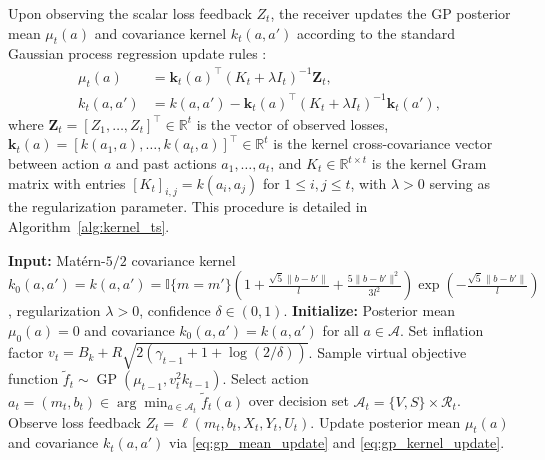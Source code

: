 Upon observing the scalar loss feedback $Z_t$, the receiver updates the GP posterior mean $\mu_t(a)$ and covariance kernel $k_t(a, a')$ according to the standard Gaussian process regression update rules \citep{chowdhury2017kernelized}:
\begin{align}
    \mu_t(a) &= \mathbf{k}_t(a)^\top (K_t + \lambda I_t)^{-1} \mathbf{Z}_t, \label{eq:gp_mean_update} \\
    k_t(a, a') &= k(a, a') - \mathbf{k}_t(a)^\top (K_t + \lambda I_t)^{-1} \mathbf{k}_t(a'), \label{eq:gp_kernel_update}
\end{align}
where $\mathbf{Z}_t = [Z_1, \ldots, Z_t]^\top \in \mathbb{R}^t$ is the vector of observed losses, $\mathbf{k}_t(a) = [k(a_1, a), \ldots, k(a_t, a)]^\top \in \mathbb{R}^t$ is the kernel cross-covariance vector between action $a$ and past actions $a_1, \ldots, a_t$, and $K_t \in \mathbb{R}^{t \times t}$ is the kernel Gram matrix with entries $[K_t]_{i,j} = k(a_i, a_j)$ for $1 \le i, j \le t$, with $\lambda > 0$ serving as the regularization parameter. This procedure is detailed in Algorithm~\ref{alg:kernel_ts}.

\begin{algorithm}[htbp]
    \caption{Gaussian Process Thompson Sampling (GP-TS)}
    \label{alg:kernel_ts}
    \small
    \begin{algorithmic}[1]
        \State \textbf{Input:} Matérn-$5/2$ covariance kernel $k_0(a,a') = k(a,a') = \mathbb{I}\{m = m'\} \left(1 + \frac{\sqrt{5}\|b - b'\|}{l} + \frac{5\|b - b'\|^2}{3 l^2}\right) \exp\left( -\frac{\sqrt{5}\|b - b'\|}{l} \right)$, regularization $\lambda > 0$, confidence $\delta \in (0,1)$.
        \State \textbf{Initialize:} Posterior mean $\mu_0(a) = 0$ and covariance $k_0(a,a') = k(a,a')$ for all $a \in \mathcal{A}$.
            \State Set inflation factor $v_t = B_k + R\sqrt{2(\gamma_{t-1}+1+\log(2/\delta))}$.
            \State Sample virtual objective function $\widetilde{f}_t \sim \operatorname{GP}(\mu_{t-1}, v_t^2 k_{t-1})$.
            \State Select action $a_t = (m_t, b_t) \in \arg\min_{a \in \mathcal{A}_t} \widetilde{f}_t(a)$ over decision set $\mathcal{A}_t = \{V, S\} \times \mathcal{R}_t$.
            \State Observe loss feedback $Z_t = \ell(m_t, b_t, X_t, Y_t, U_t)$.
            \State Update posterior mean $\mu_t(a)$ and covariance $k_t(a,a')$ via \eqref{eq:gp_mean_update} and \eqref{eq:gp_kernel_update}.
        \EndFor
    \end{algorithmic}
\end{algorithm}

